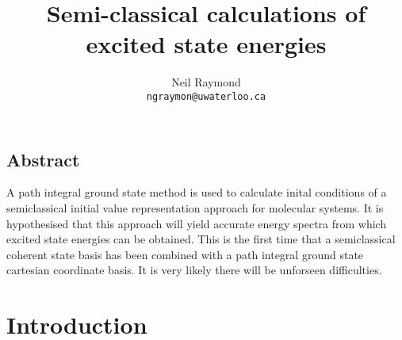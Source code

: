 \documentclass[12pt,letterpaper,oneside,final,titlepage]{article}               %
\numberwithin{equation}{section} %
\begin{document}
    \title{Semi-classical calculations of excited state energies}
    \author{Neil Raymond
           \\ \texttt{ngraymon@uwaterloo.ca}}
    \date{}
    \maketitle

\doublespacing

\subsection*{Abstract}
A path integral ground state method is used to calculate inital conditions of a semiclassical initial value representation approach for molecular systems. 
It is hypothesised that this approach will yield accurate energy spectra from which excited state energies can be obtained. 
This is the first time that a semiclassical coherent state basis has been combined with a path integral ground state cartesian coordinate basis. It is very likely there will be unforseen difficulties.

\section{Introduction}
\end{document}
